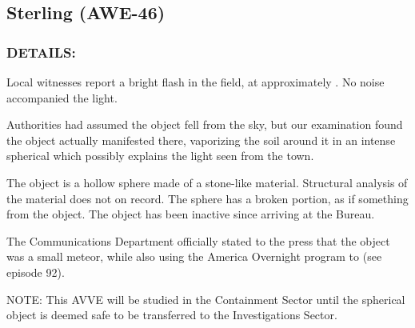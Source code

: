 \subsection*{Sterling (AWE-46)}
\subsubsection*{DETAILS:}
\par Local witnesses report a bright flash in the field, at approximately
. No noise accompanied the light.
\par Authorities had assumed the object fell from the sky, but our
examination found the object actually manifested there, vaporizing
the soil around it in an intense spherical  
which possibly explains the light seen from the town.
\par The object is a hollow sphere made of a stone-like material.
Structural analysis of the material does not  
on record. The sphere has a broken portion, as if something 
from the object. The object has been inactive since arriving at the Bureau.
\par The Communications Department officially stated to the press that
the object was a small meteor, while also using the America
Overnight program to  (see episode 92).

\par NOTE: This AVVE will be studied in the Containment Sector until
the spherical object is deemed safe to be transferred to the
Investigations Sector.